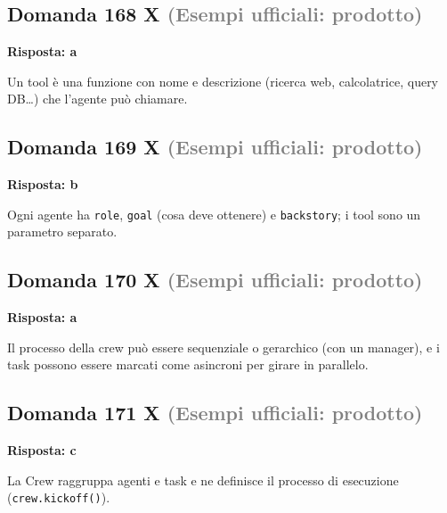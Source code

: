 \documentclass[a4paper,11pt]{article}
\begin{document}
\subsection*{Domanda 168 X \hfill {\small \textcolor{gray}{(Esempi ufficiali: prodotto)}}}
\textbf{Risposta: a}\par
Un tool è una funzione con nome e descrizione (ricerca web, calcolatrice, query DB…) che l'agente può chiamare.



\subsection*{Domanda 169 X \hfill {\small \textcolor{gray}{(Esempi ufficiali: prodotto)}}}
\textbf{Risposta: b}\par
Ogni agente ha \texttt{role}, \texttt{goal} (cosa deve ottenere) e \texttt{backstory}; i tool sono un parametro separato.



\subsection*{Domanda 170 X \hfill {\small \textcolor{gray}{(Esempi ufficiali: prodotto)}}}
\textbf{Risposta: a}\par
Il processo della crew può essere sequenziale o gerarchico (con un manager), e i task possono essere marcati come asincroni per girare in parallelo.



\subsection*{Domanda 171 X \hfill {\small \textcolor{gray}{(Esempi ufficiali: prodotto)}}}
\textbf{Risposta: c}\par
La Crew raggruppa agenti e task e ne definisce il processo di esecuzione (\texttt{crew.kickoff()}).
\end{document}
